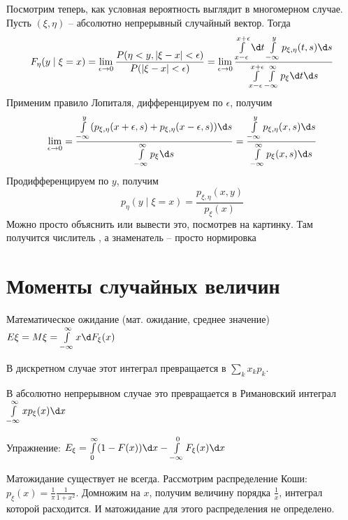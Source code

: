 Посмотрим теперь, как условная вероятность выглядит в многомерном случае.
Пусть $(\xi, \eta)$ -- абсолютно непрерывный случайный вектор. Тогда
$$F_{\eta}(y \mid \xi = x) = \lim\limits_{\epsilon \to 0} \frac{P(\eta < y, |\xi - x| < \epsilon)}{P(|\xi - x| < \epsilon)} = 
\lim\limits_{\epsilon \to 0} \frac{\int\limits_{x - \epsilon}^{x + \epsilon} \d t \int\limits_{-\infty}^y p_{\xi, \eta}(t, s) \d s}{\int\limits_{x - \epsilon}^{x + \epsilon} \int\limits_{-\infty}^{\infty}p_\xi \d t \d s}$$
Применим правило Лопиталя, дифференцируем по $\epsilon$, получим
$$\lim\limits_{\epsilon \to 0} = \frac{\int\limits_{-\infty}^y (p_{\xi, \eta}(x + \epsilon, s) + p_{\xi, \eta}(x - \epsilon, s)) \d s}{\int\limits_{-\infty}^{\infty} p_\xi\d s} = \frac{\int\limits_{-\infty}^y p_{\xi, \eta}(x, s) \d s}{\int\limits_{-\infty}^{\infty}p_\xi(x, s) \d s}$$
Продифференцируем по $y$, получим
$$p_{\eta}(y \mid \xi = x) = \frac{p_{\xi, \eta}(x, y)}{p_{\xi}(x)}$$
Можно просто объяснить или вывести это, посмотрев на картинку. Там получится числитель \TODO, а знаменатель -- просто нормировка


\section{Моменты случайных величин}
\begin{Def}
    Математическое ожидание (мат. ожидание, среднее значение) $E\xi = M\xi = \int\limits_{-\infty}^\infty x \d F_\xi(x)$

    В дискретном случае этот интеграл превращается в $\sum\limits_k x_k p_k$.

    В абсолютно непрерывном случае это превращается в Римановский интеграл $\int\limits_{-\infty}^\infty xp_\xi(x) \d x$
\end{Def}

Упражнение: $E_\xi = \int\limits_0^\infty (1 - F(x)) \d x - \int\limits_{-\infty}^0 F_\xi(x) \d x$

\begin{exmp}
Матожидание существует не всегда.
Рассмотрим распределение Коши: $p_\xi(x) = \frac{1}{\pi}\frac{1}{1 + x^2}$. Домножим на $x$, получим величину порядка $\frac{1}{x}$, интеграл которой расходится. 
И матожидание для этого распределения не определено.
\end{exmp}

